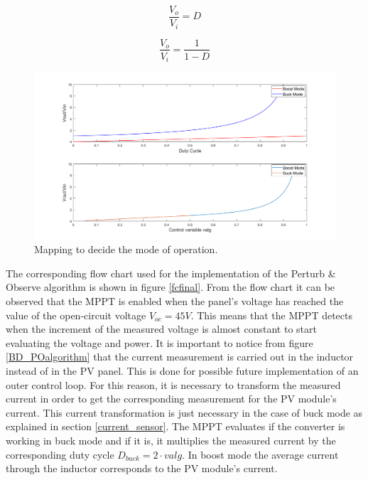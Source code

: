 \vspace{1cm}
\begin{minipage}{0.3\linewidth}
	\begin{equation}
	\frac{V_o}{V_i} = D
	\end{equation}
	\label{tfbuck}
\end{minipage}%
\begin{minipage}{0.5\linewidth}	
	\begin{equation}
	\frac{V_o}{V_i}= \frac{1}{1-D}
	\end{equation}
	\label{eq:tfboost}
\end{minipage}

\begin{figure}[H]
	\begin{center}
		\includegraphics[width=1\textwidth]{../Pictures/decision_mode_operation}
		\caption{Mapping to decide the mode of operation.}
		\label{fig:mappingtf} 
	\end{center}	
\end{figure}


The corresponding flow chart used for the implementation of the Perturb \& Observe algorithm is shown in figure \ref{fcfinal}. From the flow chart it can be observed that the MPPT is enabled when the panel's voltage has reached the value of the open-circuit voltage $V_{oc}=45 V$. This means that the MPPT detects when the increment of the measured voltage is almost constant to start evaluating the voltage and power.
It is important to notice from figure \ref{BD_POalgorithm} that the current measurement is carried out in the inductor instead of in the PV panel. This is done for possible future implementation of an outer control loop. For this reason, it is necessary to transform the measured current in order to get the corresponding measurement for the PV module's current. This current transformation is just necessary in the case of buck mode as explained in section \ref{current_sensor}. The MPPT evaluates if the converter is working in buck mode and if it is, it multiplies the measured current by the corresponding duty cycle $D_{buck}=2\cdot valg$. In boost mode the average current through the inductor corresponds to the PV module's current. 



